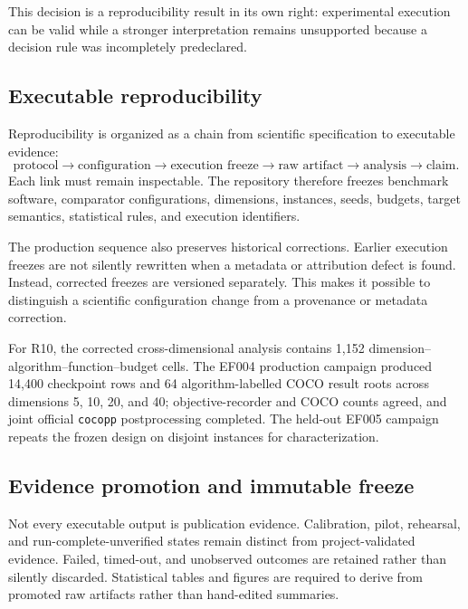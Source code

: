This decision is a reproducibility result in its own right: experimental execution can be valid while a stronger interpretation remains unsupported because a decision rule was incompletely predeclared.

\subsection{Executable reproducibility}

Reproducibility is organized as a chain from scientific specification to executable evidence:
\begin{equation}
\text{protocol}\rightarrow
\text{configuration}\rightarrow
\text{execution freeze}\rightarrow
\text{raw artifact}\rightarrow
\text{analysis}\rightarrow
\text{claim}.
\end{equation}
Each link must remain inspectable. The repository therefore freezes benchmark software, comparator configurations, dimensions, instances, seeds, budgets, target semantics, statistical rules, and execution identifiers.

The production sequence also preserves historical corrections. Earlier execution freezes are not silently rewritten when a metadata or attribution defect is found. Instead, corrected freezes are versioned separately. This makes it possible to distinguish a scientific configuration change from a provenance or metadata correction.

For R10, the corrected cross-dimensional analysis contains 1,152 dimension--algorithm--function--budget cells. The EF004 production campaign produced 14,400 checkpoint rows and 64 algorithm-labelled COCO result roots across dimensions 5, 10, 20, and 40; objective-recorder and COCO counts agreed, and joint official \texttt{cocopp} postprocessing completed. The held-out EF005 campaign repeats the frozen design on disjoint instances for characterization.

\subsection{Evidence promotion and immutable freeze}

Not every executable output is publication evidence. Calibration, pilot, rehearsal, and run-complete-unverified states remain distinct from project-validated evidence. Failed, timed-out, and unobserved outcomes are retained rather than silently discarded. Statistical tables and figures are required to derive from promoted raw artifacts rather than hand-edited summaries.

